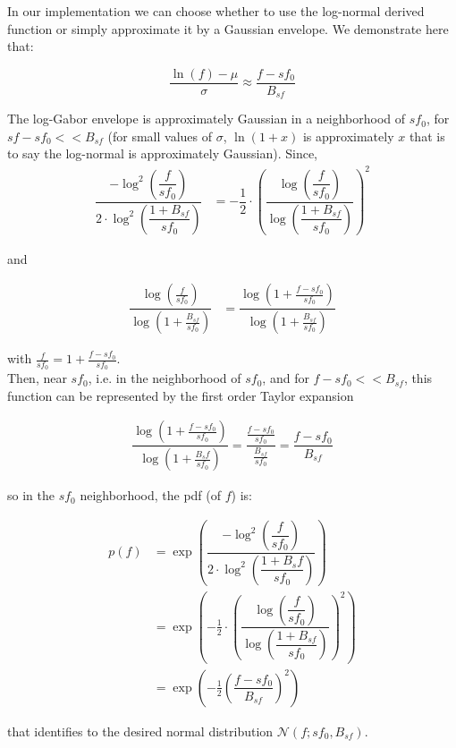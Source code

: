 \documentclass[a4paper,11pt]{article}%
\begin{document}
In our implementation we can choose whether to use the log-normal derived function or simply approximate it by a Gaussian envelope. We demonstrate here that:

 \[
 \dfrac{\ln(f) -\mu}{\sigma} \approx \dfrac{f -sf_{0}}{B_{sf}}
 \]
 
The log-Gabor envelope is approximately Gaussian in a neighborhood of $sf_{0}$, for $sf-sf_{0} << B_{sf}$ (for small values of $\sigma$, $\ln(1+x)$ is approximately $x$ that is to say the log-normal is approximately Gaussian).  
Since,
\begin{align}
 \dfrac{-\log^{2}\left(\dfrac{f}{sf_{0}}\right)}{2\cdot\log^{2} \left( \dfrac{1+B_{sf}}{sf_{0}} \right)} &= -\dfrac{1}{2} \cdot \left( \dfrac{\log \left (\dfrac{f}{sf_{0}}\right)}{\log\left(\dfrac{1+B_{sf}}{sf_{0}}\right)}\right)^{2}
\end{align}
 
and
 
\begin{align}
 \dfrac{\log \left(\frac{f}{sf_{0}}\right)}{\log\left(1+\frac{B_{sf}}{sf_{0}}\right)}&= \dfrac{\log\left(1 + \frac{f-sf_{0}}{sf_{0}}\right)}{\log\left(1+\frac{B_{sf}}{sf_{0}}\right)}
\end{align}

 with $\frac{f}{sf_{0}}=1 + \frac{f-sf_{0}}{sf_{0}}$.\\
 Then, near $sf_{0}$, i.e. in the neighborhood of $sf_{0}$, and for $f-sf_{0} << B_{sf}$, this function can be represented by the first order Taylor expansion  
 
\begin{align}
 \dfrac{\log\left(1 + \frac{f-sf_{0}}{sf_{0}}\right)}{\log\left(1+\frac{B_sf}{sf_{0}}\right)}  =  \dfrac{\frac{f-sf_{0}}{{sf_{0}}}}{\frac{B_{sf}}{sf_{0}}} = \dfrac{f -sf_{0}}{B_{sf}}
\end{align}

 so in the  $sf_{0}$ neighborhood, the pdf (of $f$) is:

 \begin{align}
 p(f) &=  \exp \left(\dfrac{-\log^{2}\left(\dfrac{f}{sf_{0}}\right)}{2\cdot \log^{2} \left( \dfrac{1+B_sf}{sf_{0}}\right)}\right) \\
    &=  \exp\left(- \frac{1}{2} \cdot \left( \dfrac{\log\left(\dfrac{f}{sf_{0}}\right)}{\log\left(\dfrac{1+B_{sf}}{sf_{0}}\right)}\right)^{2} \right) \\
    &=  \exp\left(- \frac{1}{2} \left(\dfrac{f -sf_{0}}{B_{sf}}  \right)^{2} \right)
\end{align}

that identifies to the desired normal distribution $\mathcal{N}(f ; sf_{0}, B_{sf})$.


\end{document}
